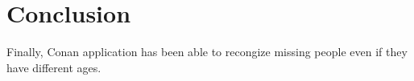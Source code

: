 \documentclass[pdftex,10pt,a4paper,oneside]{article}
\begin{document}
	\pagebreak
	\section{Conclusion}
	Finally, Conan application has been able to recongize missing people even if they have different ages.
	


	

	\pagebreak	
%	 
%	
	
	
	\printglossary
\end{document}
